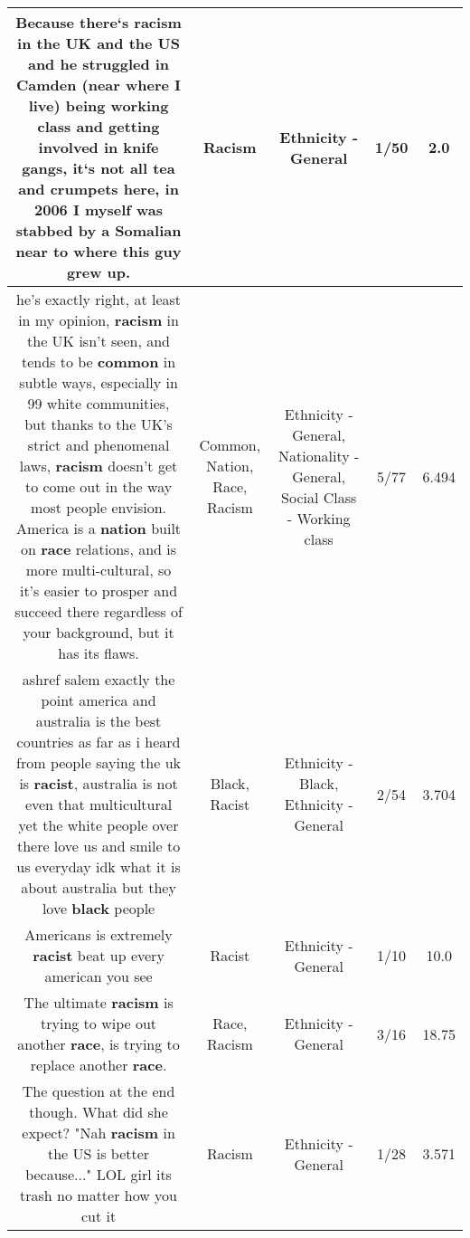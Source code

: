 \documentclass[11pt]{article}
\newlength\mylength
\begin{document}
\begin{center}
\begin{longtable}{|C{.65\mylength}|C{.30\mylength}|C{.12\mylength}|C{.12\mylength}|C{.12\mylength}|}
  \small Because there`s \textbf{racism} in the UK and the US and he struggled in Camden (near where I live) being working class and getting involved in knife gangs, it`s not all tea and crumpets here, in 2006 I myself was stabbed by a Somalian near to where this guy grew up.\normalsize   & Racism & Ethnicity - General & 1/50 & 2.0 \\  \hline
  \small he's exactly right, at least in my opinion, \textbf{racism} in the UK isn't seen, and tends to be \textbf{common} in subtle ways, especially in 99 white communities, but thanks to the UK's strict and phenomenal laws, \textbf{racism} doesn't get to come out in the way most people envision. America is a \textbf{nation} built on \textbf{race} relations, and is more multi-cultural, so it's easier to prosper and succeed there regardless of your background, but it has its flaws.\normalsize   & Common, Nation, Race, Racism & Ethnicity - General, Nationality - General, Social Class - Working class & 5/77 & 6.494 \\  \hline
  \small ashref salem exactly the point america and australia is the best countries as far as i heard from people saying the uk is \textbf{racist}, australia is not even that multicultural yet the white people over there love us and smile to us everyday idk what it is about australia but they love \textbf{black} people\normalsize   & Black, Racist & Ethnicity - Black, Ethnicity - General & 2/54 & 3.704 \\  \hline
  \small Americans is extremely \textbf{racist} beat up every american you see\normalsize   & Racist & Ethnicity - General & 1/10 & 10.0 \\  \hline
  \small The ultimate \textbf{racism} is trying to wipe out another \textbf{race}, is trying to replace another \textbf{race}.\normalsize   & Race, Racism & Ethnicity - General & 3/16 & 18.75 \\  \hline
  \small The question at the end though. What did she expect? "Nah \textbf{racism} in the US is better because..." LOL girl its trash no matter how you cut it\normalsize   & Racism & Ethnicity - General & 1/28 & 3.571 \\  \hline

\end{longtable}
\end{center}
\end{document}
